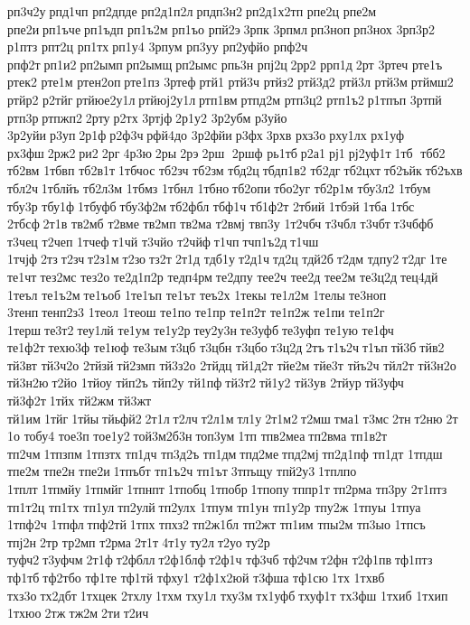 рп3ч2у рпд1чп 
рп2дпде 
рп2д1п2л рпдп3н2 рп2д1х2тп 	рпе2ц 	рпе2м 	рпе2и рп1ъче рп1ъдп 
рп1ъ2м 	рп1ъо 	рпй2э 3рпк 	3рпмл рп3ноп рп3нох 	3рп3р2 	р1птз 	рпт2ц 	рп1тх рп1у4 	3рпум 	рп3уу 
рп2уфйо 	рпф2ч 	рпф2т рп1и2 рп2ымп рп2ымщ рп2ымс 	рпь3н 	рпј2ц 2рр2 	ррп1д 2рт  	3ртеч 	рте1ъ 	ртек2 	рте1м 
ртен2оп рте1пз 	3ртеф ртй1 	ртй3ч 	ртйз2 
ртй3д2 	ртй3л 	ртй3м ртймш2 	ртйр2 	р2тйг ртйюе2у1л ртйюј2у1л ртп1вм ртпд2м 
ртп3ц2 
ртп1ъ2 р1тпъп 	3ртпй 	ртп3р ртпжп2 2рту р2тх 	3ртјф 2р1у2 
3р2убм 	р3уйо 
3р2уйи р3уп 2р1ф р2ф3ч рфй4до 
3р2фйи р3фх 3рхв 	рхз3о рху1лх 	рх1уф 	рх3фш 2рж2 ри2 2рг 4р3ю 2ры 2рэ 2рш  2ршф 	рь1тб р2а1 рј1 рј2уф1т 1тб  тбб2 	тб2вм 	1тбвп 
тб2в1т 1тбчос 	тб2зч 	тб2зм 	тбд2ц тбдп1в2 	тб2дг тб2цхт тб2ъйк тб2ъхв 	тбл2ч 1тблйъ 
тб2л3м 	1тбмз 	1тбнл 	1тбно тб2опи тбо2уг 
тб2р1м 
тбу3л2 	1тбум 	тбу3р 	тбу1ф 1тбуфб тбу3ф2м тб2фбл 	тбф1ч 
тб1ф2т 	2тбий 	1тбэй 1тба 1тбс 	2тбсф 2т1в 	тв2мб 	т2вме 	тв2мп 	тв2ма 	т2вмј 	твп3у 
1т2чбч 	т3чбл 	т3чбт т3чбфб 	т3чец 	т2чеп 	1тчеф т1чй 	т3чйо 	т2чйф т1чп тчп1ъ2д т1чш 	1тчјф 2тз т2зч т2з1м т2зо тз2т 2т1д 	тдб1у т2д1ч тд2ц 	тдй2б т2дм 	тдпу2 т2дг 1те  	те1чт тез2мс 	тез2о 
те2д1п2р 
тедп4рм те2дпу 	тее2ч 	тее2д 	тее2м 
те3ц2д тец4дй 	1теъл 
те1ъ2м те1ъоб 
1те1ъп 	те1ът 	теъ2х 	1текы 
те1л2м 	1телы те3ноп 	3тенп тенп2з3 	1теол 	1теош 	те1по 	те1пр 
те1п2т 
те1п2ж 	те1пи 
те1п2г 	1терш те3т2 теу1лй 	те1ум 
те1у2р теу2у3н те3уфб те3уфп 	те1ую 	те1фч 
те1ф2т техю3ф 	те1юф 	те3ым т3цб  	т3цбн 	т3цбо т3ц2д 2тъ т1ъ2ч т1ъп тй3б тйв2 	тй3вт 
тй3ч2о 	2тйзй тй2змп 
тй3з2о 	2тйдц 
тй1д2т 	тйе2м 	тйе3т 	тйъ2ч 	тйл2т 
тй3н2о 
тй3н2ю т2йо 	1тйоу 	тйп2ъ 	тйп2у 	тй1пф тй3т2 тй1у2 	тй3ув 	2тйур тй3уфч 
тй3ф2т 1тйх 	тй2жм 	тй3жт 	тй1им 1тйг 1тйы тйьфй2 2т1л т2лч т2л1м тл1у 2т1м2 т2мш тма1 т3мс 2тн т2ню 2т1о 	тобу4 	тое3п 
тое1у2 той3м2б3н топ3ум 1тп  
тпв2меа тп2вма 
тп1в2т 	тп2чм 1тпзпм 1тпзтх 	тп1дч 
тп3д2ъ 	тп1дм тпд2ме тпд2мј тп2д1пф 	тп1дт 	1тпдш 	тпе2м 	тпе2н 	тпе2и 1тпъбт 
тп1ъ2ч 	тп1ът 3тпъщу 
тпй2у3 1тплпо 	1тплт 1тпмйу 1тпмйг 1тпнпт 1тпобц 1тпобр 1тпопу тппр1т тп2рма 	тп3ру 
2т1птз 
тп1т2ц 	тп1тх 	тп1ул тп2улй тп2улх 	1тпум 	тп1ун 
тп1у2р 	тпу2ж 	1тпуы 	1тпуа 
1тпф2ч 	1тпфл тпф2тй 1тпх 	тпхз2 тп2ж1бл 	тп2жт 	тп1им 	тпы2м 	тп3ыо 	1тпсъ 	тпј2н 2тр 	тр2мп 	т2рма 2т1т 4т1у ту2л т2уо ту2р 	туфч2 т3уфчм 2т1ф т2фблл т2ф1блф т2ф1ч 	тф3чб 	тф2чм т2фн 
т2ф1пв тф1птз 	тф1тб тф2тбо 	тф1те 	тф1тй 	тфху1 
т2ф1х2юй 	т3фша 	тф1сю 1тх  	1тхвб 	тхз3о тх2дбт 1тхцек 	2тхлу 1тхм 	тху1л 	тху3м тх1уфб тхуф1т 	тх3фш 	1тхиб 	1тхип 	1тхюо 2тж тж2м 2ти т2ич 
